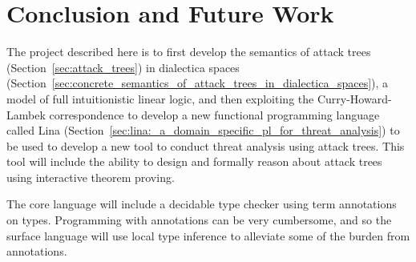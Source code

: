 \documentclass{sigplanconf}
\begin{document}

\section{Conclusion and Future Work}
\label{sec:conclusion}

The project described here is to first develop the semantics of attack
trees (Section~\ref{sec:attack_trees}) in dialectica spaces
(Section~\ref{sec:concrete_semantics_of_attack_trees_in_dialectica_spaces}),
a model of full intuitionistic linear logic, and then exploiting the
Curry-Howard-Lambek correspondence to develop a new functional
programming language called Lina
(Section~\ref{sec:lina:_a_domain_specific_pl_for_threat_analysis}) to
be used to develop a new tool to conduct threat analysis using attack
trees.  This tool will include the ability to design and formally
reason about attack trees using interactive theorem proving.

The core language will include a decidable type checker
using term annotations on types.  Programming with annotations can be
very cumbersome, and so the surface language will use local type
inference \cite{Pierce:2000} to alleviate some of the burden from
annotations.  


\end{document}
